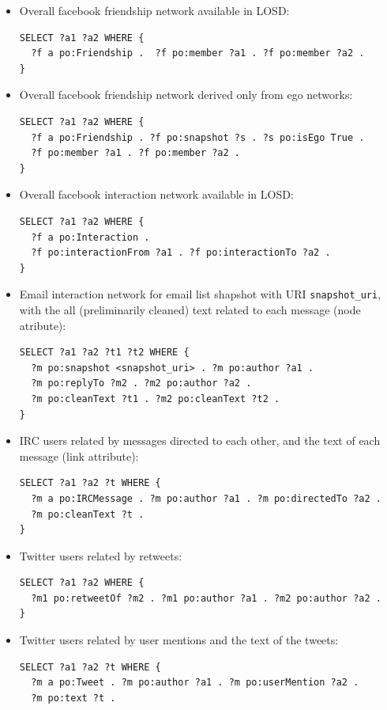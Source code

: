 \documentclass[data,datadescriptor,submit,moreauthors,pdftex]{Definitions/mdpi}
\begin{document}
\begin{itemize}
  \item Overall facebook friendship network available in LOSD:
\begin{lstlisting}[language=spq]
SELECT ?a1 ?a2 WHERE { 
  ?f a po:Friendship .  ?f po:member ?a1 . ?f po:member ?a2 .
}
\end{lstlisting}
  \item Overall facebook friendship network derived only from ego networks:
\begin{lstlisting}[language=spq]
SELECT ?a1 ?a2 WHERE { 
  ?f a po:Friendship . ?f po:snapshot ?s . ?s po:isEgo True .
  ?f po:member ?a1 . ?f po:member ?a2 .
}
\end{lstlisting}
  \item Overall facebook interaction network available in LOSD:
\begin{lstlisting}[language=spq]
SELECT ?a1 ?a2 WHERE { 
  ?f a po:Interaction .
  ?f po:interactionFrom ?a1 . ?f po:interactionTo ?a2 .
}
\end{lstlisting}
  \item Email interaction network for email list shapshot with URI \verb|snapshot_uri|,
    with the all (preliminarily cleaned) text related to each message (node atribute):
\begin{lstlisting}[language=spq]
SELECT ?a1 ?a2 ?t1 ?t2 WHERE { 
  ?m po:snapshot <snapshot_uri> . ?m po:author ?a1 .
  ?m po:replyTo ?m2 . ?m2 po:author ?a2 .
  ?m po:cleanText ?t1 . ?m2 po:cleanText ?t2 .
}
\end{lstlisting}
  \item IRC users related by messages directed to each other, and the text of each message (link attribute):
\begin{lstlisting}[language=spq]
SELECT ?a1 ?a2 ?t WHERE { 
  ?m a po:IRCMessage . ?m po:author ?a1 . ?m po:directedTo ?a2 .
  ?m po:cleanText ?t .
}
\end{lstlisting}
  \item Twitter users related by retweets:
\begin{lstlisting}[language=spq]
SELECT ?a1 ?a2 WHERE { 
  ?m1 po:retweetOf ?m2 . ?m1 po:author ?a1 . ?m2 po:author ?a2 .
}
\end{lstlisting}
  \item Twitter users related by user mentions and the text of the tweets:
\begin{lstlisting}[language=spq]
SELECT ?a1 ?a2 ?t WHERE { 
  ?m a po:Tweet . ?m po:author ?a1 . ?m po:userMention ?a2 .
  ?m po:text ?t .

\end{lstlisting}
\end{itemize}
\end{document}
